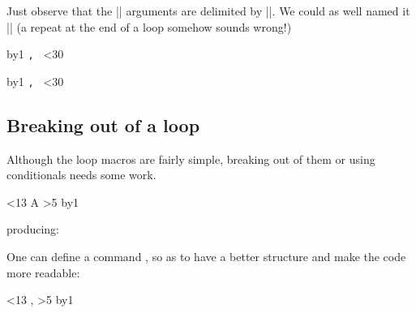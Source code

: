 \documentclass{ltxdoc}
\begin{document}
Just observe that the |\loop| arguments are delimited by |\repeat|. We could as well named it |\endloop| (a repeat at the end of a loop somehow sounds wrong!)

\begin{teX}
\def\for#1\endfor{\def\body{#1}\iterate}
\def\iterate{\body\let\next=\iterate\else\let\next=\relax\fi\next}
\newcount\n
{}
\for
   \advance\n by1
     \texttt{\number\n, }  
   \ifnum\n<30
\endfor
\end{teX}  

\def\for#1\endfor{\def\body{#1}\iterate}
\def\iterates{\body\let\next=\iterates\else\let\next=\relax\fi\next}

\noindent\colorbox{gray!10}{\parbox{10cm}{\noindent
\newcount\n
{}
\for%
   \advance\n by1
     \texttt{\number\n, }%
   \ifnum\n<30%
\endfor%
}}

\subsection{Breaking out of a loop}

Although the loop macros are fairly simple, breaking out of them or using conditionals needs some work.

\begin{teXXX}
\newcount\mycount
{}
\loop\ifnum\mycount<13
A 
\ifnum\mycount>5
    \let\iterate\relax
 \fi
 \advance\mycount by1\relax
\repeat
\end{teXXX}
\medskip
producing:
\medskip



One can define a command , so as to have a better structure and make the code more readable:

\begin{teXXX}
\def\break{\let\iterate\relax}
\newcount\mycount
{}
\loop\ifnum\mycount<13
\the\mycount, 
\ifnum\mycount>5
    \break    
\fi
\advance\mycount by1\relax
\repeat
\end{teXXX}
\end{document}
